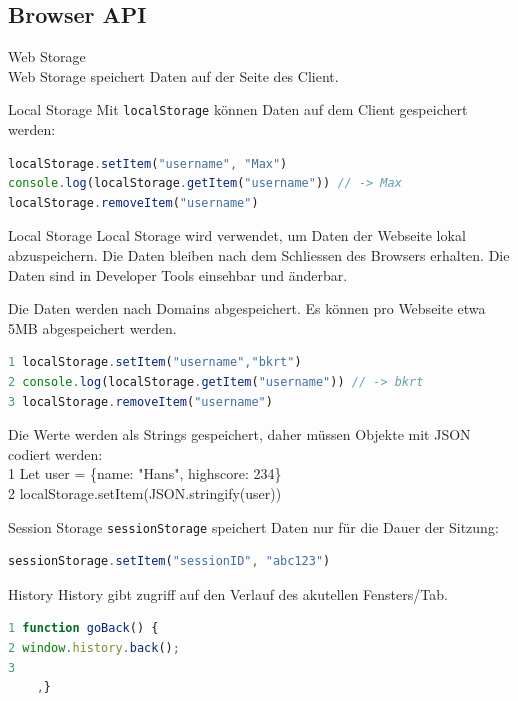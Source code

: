\subsection{Browser API}

Web Storage\\
Web Storage speichert Daten auf der Seite des Client.

\begin{definition}{Local Storage}
Mit \texttt{localStorage} können Daten auf dem Client gespeichert werden:
\begin{lstlisting}[language=JavaScript, style=basesmol]
localStorage.setItem("username", "Max")
console.log(localStorage.getItem("username")) // -> Max
localStorage.removeItem("username")
\end{lstlisting}
\end{definition}

\begin{definition}{Local Storage}
Local Storage wird verwendet, um Daten der Webseite lokal abzuspeichern. Die Daten bleiben nach dem Schliessen des Browsers erhalten. Die Daten sind in Developer Tools einsehbar und änderbar.

Die Daten werden nach Domains abgespeichert. Es können pro Webseite etwa 5MB abgespeichert werden.

\begin{lstlisting}[language=JavaScript, style=basesmol]
1 localStorage.setItem("username","bkrt")
2 console.log(localStorage.getItem("username")) // -> bkrt
3 localStorage.removeItem("username")
\end{lstlisting}
\end{definition}

Die Werte werden als Strings gespeichert, daher müssen Objekte mit JSON codiert werden:\\
1 Let user = \{name: "Hans", highscore: 234\}\\
2 localStorage.setItem(JSON.stringify(user))

\begin{definition}{Session Storage}
\texttt{sessionStorage} speichert Daten nur für die Dauer der Sitzung:
\begin{lstlisting}[language=JavaScript, style=basesmol]
sessionStorage.setItem("sessionID", "abc123")
\end{lstlisting}
\end{definition}

\begin{definition}{History}
History gibt zugriff auf den Verlauf des akutellen Fensters/Tab.

\begin{lstlisting}[language=JavaScript, style=basesmol]
1 function goBack() {
2 window.history.back();
3
    ,}
\end{lstlisting}
\end{definition}

